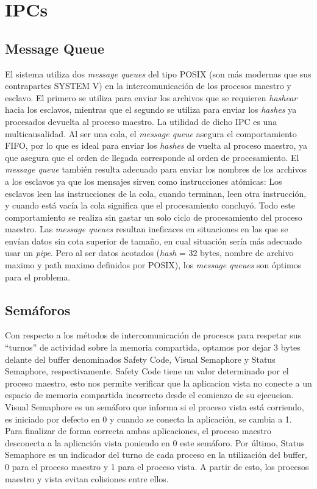 \documentclass[10pt,a4paper]{report}
\begin{document}
\section{IPCs}
\subsection{Message Queue}
	El sistema utiliza dos \textit{message queues} del tipo POSIX (son más modernas que sus contrapartes SYSTEM V) en la intercomunicación de los procesos maestro y esclavo. El primero se utiliza para enviar los archivos que se requieren \textit{hashear} hacia los esclavos, mientras que el segundo se utiliza para enviar los \textit{hashes} ya procesados devuelta al proceso maestro. La utilidad de dicho IPC es una multicausalidad. Al ser una cola, el \textit{message queue} asegura el comportamiento FIFO, por lo que es ideal para enviar los \textit{hashes} de vuelta al proceso maestro, ya que asegura que el orden de llegada corresponde al orden de procesamiento. El \textit{message queue} también resulta adecuado para enviar los nombres de los archivos a los esclavos ya que los mensajes sirven como instrucciones atómicas: Los esclavos leen las instrucciones de la cola, cuando terminan, leen otra instrucción, y cuando está vacía la cola significa que el procesamiento concluyó. Todo este comportamiento se realiza sin gastar un solo ciclo de procesamiento del proceso maestro. Las \textit{message queues} resultan ineficaces en situaciones en las que se envían datos sin cota superior de tamaño, en cual situación sería más adecuado usar un \textit{pipe}. Pero al ser datos acotados (\textit{hash} = 32 bytes, nombre de archivo maximo y path maximo definidos por POSIX), los \textit{message queues} son óptimos para el problema. 
\subsection{Semáforos} 
Con respecto a los métodos de intercomunicación de procesos para respetar sus “turnos” de actividad sobre la memoria compartida, optamos por dejar 3 bytes delante del buffer denominados Safety Code, Visual Semaphore y Status Semaphore, respectivamente. 
Safety Code tiene un valor determinado por el proceso maestro, esto nos permite verificar que la aplicacion vista no conecte a un espacio de memoria compartida incorrecto desde el comienzo de su ejecucion. 
Visual Semaphore es un semáforo que informa si el proceso vista está corriendo, es iniciado por defecto en 0 y cuando se conecta la aplicación, se cambia a 1. Para finalizar de forma correcta ambas aplicaciones, el proceso maestro desconecta a la aplicación vista poniendo en 0 este semáforo.
Por último, Status Semaphore es un indicador del turno de cada proceso en la utilización del buffer, 0 para el proceso maestro y 1 para el proceso vista. A partir de esto, los procesos maestro y vista evitan colisiones entre ellos. 
\end{document}
